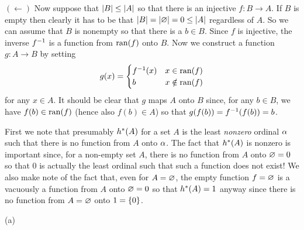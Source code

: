 {{    $(\leftarrow)$ Now suppose that $\left| B \right| \leq \left| A \right|$ so that there is an injective $f: B \to A$.
    If $B$ is empty then clearly it has to be that $\left| B \right| = \left| \varnothing \right| = 0 \leq \left| A \right|$ regardless of $A$.
    So we can assume that $B$ is nonempty so that there is a $b \in B$.
    Since $f$ is injective, the inverse $f^{-1}$ is a function from $\mathrm{ran}(f)$ onto $B$.
    Now we construct a function $g: A \to B$ by setting
    $$
    g(x) = \begin{cases}
      f^{-1}(x) & x \in \mathrm{ran}(f) \\
      b & x \notin \mathrm{ran}(f)
    \end{cases}
    $$
    for any $x \in A$.
    It should be clear that $g$ maps $A$ onto $B$ since, for any $b \in B$, we have $f(b) \in \mathrm{ran}(f)$ (hence also $f(b) \in A$) so that $g(f(b)) = f^{-1}(f(b)) = b$.
  }

  \mainprob

  First we note that presumably $h^*(A)$ for a set $A$ is the least \emph{nonzero} ordinal $\alpha$ such that there is no function from $A$ onto $\alpha$.
  The fact that $h^*(A)$ is nonzero is important since, for a non-empty set $A$, there is no function from $A$ onto $\varnothing = 0$ so that $0$ is actually the least ordinal such that such a function does not exist!
  We also make note of the fact that, even for $A=\varnothing$, the empty function $f = \varnothing$ is a vacuously a function from $A$ onto $\varnothing = 0$ so that $h^*(A) = 1$ anyway since there is no function from $A = \varnothing$ onto $1 = \left\{ 0 \right\}$.

  (a)

}
